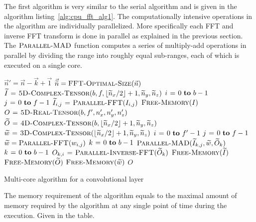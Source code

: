 \documentclass[conference]{IEEEtran}
\DeclarePairedDelimiter{\floor}{\lfloor}{\rfloor}
\begin{document}
  The first algorithm is very similar to the serial algorithm and is
  given in the algorithm listing~\ref{alg:cpu_fft_alg1}.  The
  computationally intensive operations in the algorithm are
  individually parallelized.  More specifically each FFT and inverse
  FFT transform is done in parallel as explained in the previous
  section.  The $\textnormal{\scshape Parallel-MAD}$ function computes a series of
  multiply-add operations in parallel by dividing the range into
  roughly equal sub-ranges, each of which is executed on a single
  core.

  \begin{algorithm}
    {\small
      \begin{codebox}
        \li $\vec{n}' = \vec{n} - \vec{k} + \vec{1}$
        \li $\vec{\widetilde{n}} = \textnormal{\scshape FFT-Optimal-Size}(\vec{n})$
        \li $\widetilde{I} \gets \proc{5D-Complex-Tensor}(b,f,\floor{\widetilde{n}_x/2}+1,\widetilde{n}_y,\widetilde{n}_z)$
        \li \For $i \gets 0 \To b-1$
        \li   \Do \For $j \gets 0 \To f-1$
        \li     \Do $\widetilde{I}_{i,j} \mathrel{\hspace{1pt}=\hspace{1pt}} \textnormal{\scshape Parallel-FFT}(I_{i,j})$
        \End \End
        \li $\textnormal{\scshape Free-Memory}(I)$
        \li $O \mathrel{\hspace{1pt}=\hspace{1pt}} \textnormal{\scshape5D-Real-Tensor}(b,f',n'_x,n'_y,n'_z)$
        \li $\widetilde{O} \gets \proc{4D-Complex-Tensor}(b,\floor{\widetilde{n}_x/2}+1,\widetilde{n}_y,\widetilde{n}_z)$
        \li $\widetilde{w} \gets \proc{3D-Complex-Tensor}(\floor{\widetilde{n}_x/2}+1,\widetilde{n}_y,\widetilde{n}_z)$
        \li \For $i \gets 0 \To f'-1$
        \li   \Do \For $j \gets 0 \To f-1$
        \li     \Do $\widetilde{w} = \textnormal{\scshape Parallel-FFT}(w_{i,j})$
        \li         \For $k \gets 0 \To b-1$
        \li           \Do $\textnormal{\scshape Parallel-MAD}(\widetilde{I}_{k,j}, \widetilde{w}, \widetilde{O}_{k})$
        \End \End
        \li   \For $k \gets 0 \To b-1$
        \li      \Do $O_{k,i} \mathrel{\hspace{1pt}=\hspace{1pt}} \textnormal{\scshape Parallel-Inverse-FFT}(\widetilde{O}_{k})$
        \End \End
        \li $\textnormal{\scshape Free-Memory}(\widetilde{I})$
        \li $\textnormal{\scshape Free-Memory}(\widetilde{O})$
        \li $\textnormal{\scshape Free-Memory}(\widetilde{w})$
        \li \Return $O$
      \end{codebox}
    }

    \caption{Multi-core algorithm for a convolutional layer}
    \label{alg:cpu_fft_alg1}
  \end{algorithm}

  The memory requirement of the algorithm equals to the maximal amount
  of memory required by the algorithm at any single point of time
  during the execution.  Given in the table.
\end{document}
